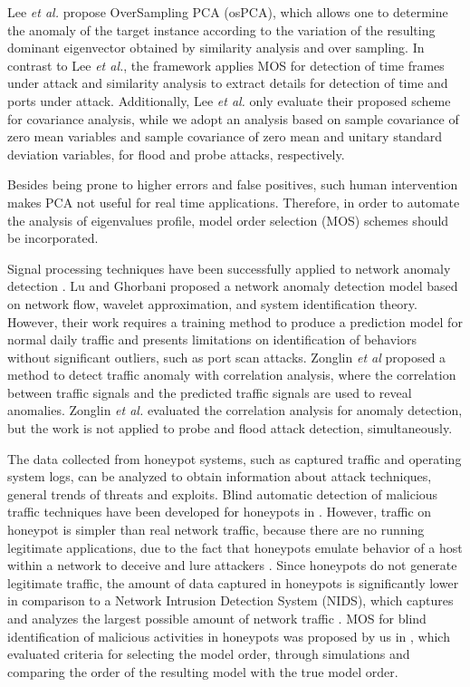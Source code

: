 Lee \emph{et al.} \cite{Lee2013} propose OverSampling PCA (osPCA), which allows one to determine the anomaly of the target instance according to the variation of the resulting dominant eigenvector obtained by similarity analysis and over sampling. In contrast to Lee \emph{et al.}, the framework applies MOS for detection of time frames under attack and similarity analysis to extract details for detection of time and ports under attack. Additionally, Lee \emph{et al.} only evaluate their proposed scheme for covariance analysis, while we adopt an analysis based on sample covariance of zero mean variables and sample covariance of zero mean and unitary standard deviation variables, for flood and probe attacks, respectively. 

Besides being prone to higher errors and false positives, such human intervention makes PCA not useful for real time applications. Therefore, in order to automate the analysis of eigenvalues profile, model order selection (MOS) schemes should be incorporated.

Signal processing techniques have been successfully applied to network anomaly detection \cite{Lu2009}. Lu and Ghorbani \cite{Lu2009} proposed a network anomaly detection model based on network flow, wavelet approximation, and system identification theory. However, their work requires a training method to produce a prediction model for normal daily traffic and presents limitations on identification of behaviors without significant outliers, such as port scan attacks. Zonglin \emph{et al} \cite{Zonglin2009} proposed a method to detect traffic anomaly with correlation analysis, where the correlation between traffic signals and the predicted traffic signals are used to reveal anomalies. Zonglin \emph{et al.} \cite{Zonglin2009} evaluated the correlation analysis for anomaly detection, but the work is not applied to probe and flood attack detection, simultaneously. 

The data collected from honeypot systems, such as captured traffic and operating system logs, can be analyzed to obtain information about attack techniques, general trends of threats and exploits. Blind automatic detection of malicious traffic techniques have been developed for honeypots in \cite{david2011blind,da2012improved}. However, traffic on honeypot is simpler than real network traffic, because there are no running legitimate applications, due to the fact that honeypots emulate behavior of a host within a network to deceive and lure attackers \cite{zakaria2012review}. Since honeypots do not generate legitimate traffic, the amount of data captured in honeypots is significantly lower in comparison to a Network Intrusion Detection System (NIDS), which captures and analyzes the largest possible amount of network traffic \cite{david2011blind}. MOS for blind identification of malicious activities in honeypots was proposed by us in \cite{david2011blind}, which evaluated criteria for selecting the model order, through simulations and comparing the order of the resulting model with the true model order.

